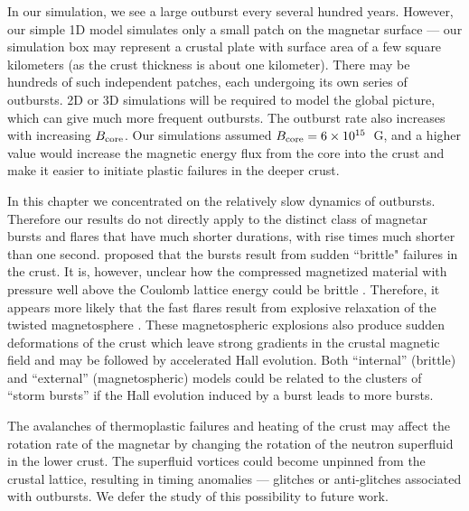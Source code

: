 In our simulation, we see a large outburst every several hundred years. 
However, our simple 1D model simulates only a small patch on the magnetar surface --- our simulation box may represent a crustal plate with surface area of a few square kilometers (as the crust thickness is about one kilometer). 
There may be hundreds of such independent patches, each undergoing its own series of outbursts. 
2D or 3D simulations will be required to model the global picture, which can give much more frequent outbursts. 
The outburst rate also increases with increasing $B_{\rm core}$.
Our simulations assumed $B_{\rm core}=6\times 10^{15}$~G, and a higher value would increase the magnetic energy flux from the core into the crust and make it easier to initiate plastic failures in the deeper crust.

In this chapter we concentrated on the relatively slow dynamics of outbursts. 
Therefore our results do not directly apply to the distinct class of magnetar bursts and flares that have much shorter durations, with rise times much shorter than one second. 
\citet{1995MNRAS.275..255T,1996ApJ...473..322T} proposed that the bursts result from sudden ``brittle" failures in the crust. 
It is, however, unclear how the compressed magnetized material with pressure well above the Coulomb lattice energy could be brittle \citep{2003ApJ...595..342J,2012MNRAS.427.1574L,2014ApJ...794L..24B}.
Therefore, it appears more likely that the fast flares result from explosive relaxation of the twisted magnetosphere \citep{1995MNRAS.275..255T,2006MNRAS.367.1594L,2012ApJ...754L..12P,2013ApJ...774...92P}. 
These magnetospheric explosions also produce sudden deformations of the crust 
\citep{2015ApJ...815...25L} which leave strong gradients in the crustal magnetic field and may be followed by accelerated Hall evolution. Both ``internal'' (brittle) and ``external'' (magnetospheric) models could be related to the clusters of ``storm bursts''  \citep{2006A&A...445..313G,2008ApJ...685.1114I,2010MNRAS.408.1387I,2011ApJ...739...94S} if the Hall evolution induced by a burst leads to more bursts.

The avalanches of thermoplastic failures and heating of the crust may affect the rotation rate of the magnetar by changing the rotation of the neutron superfluid in the lower crust. 
The superfluid vortices could become unpinned from the crustal lattice, resulting in timing anomalies --- glitches or anti-glitches associated with outbursts.
We defer the study of this possibility to future work.

